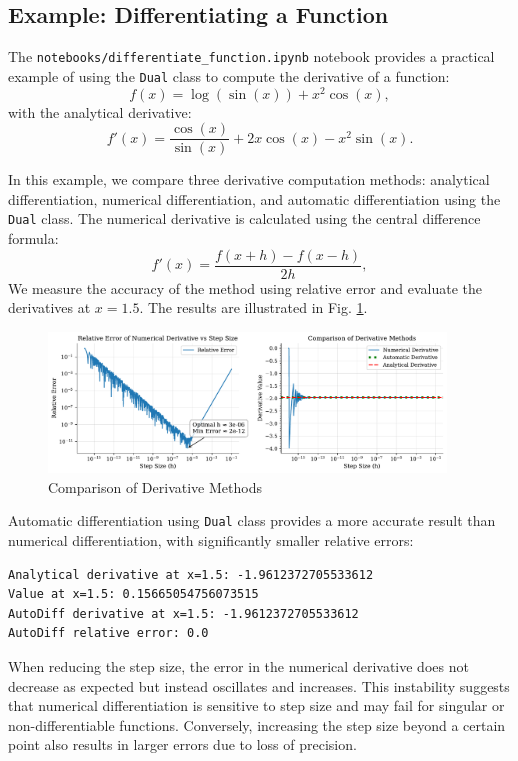 \documentclass{article}
\begin{document}
\subsection{Example: Differentiating a Function}

The \texttt{notebooks/differentiate\_function.ipynb} notebook provides a practical example of using the \texttt{Dual} class to compute the derivative of a function:
\[
f(x) = \log(\sin(x)) + x^2 \cos(x),
\]
with the analytical derivative:
\[
f'(x) = \frac{\cos(x)}{\sin(x)} + 2x \cos(x) - x^2 \sin(x).
\]

In this example, we compare three derivative computation methods: analytical differentiation, numerical differentiation, and automatic differentiation using the \texttt{Dual} class. The numerical derivative is calculated using the central difference formula:
\[
f'(x) = \frac{f(x+h) - f(x-h)}{2h},
\]
We measure the accuracy of the method using relative error and evaluate the derivatives at $x=1.5$. The results are illustrated in Fig. \ref{fig:error}.

\begin{figure}[!htbp]
\centering
\includegraphics[width=0.94\textwidth]{./images/derivative_comparison.pdf}
\caption{Comparison of Derivative Methods}
\label{fig:error}
\end{figure}



Automatic differentiation using \texttt{Dual} class provides a more accurate result than numerical differentiation, with significantly smaller relative errors:

\begin{lstlisting}[style=input]
Analytical derivative at x=1.5: -1.9612372705533612
Value at x=1.5: 0.15665054756073515
AutoDiff derivative at x=1.5: -1.9612372705533612
AutoDiff relative error: 0.0
\end{lstlisting}

When reducing the step size, the error in the numerical derivative does not decrease as expected but instead oscillates and increases. This instability suggests that numerical differentiation is sensitive to step size and may fail for singular or non-differentiable functions. Conversely, increasing the step size beyond a certain point also results in larger errors due to loss of precision.
\end{document}

